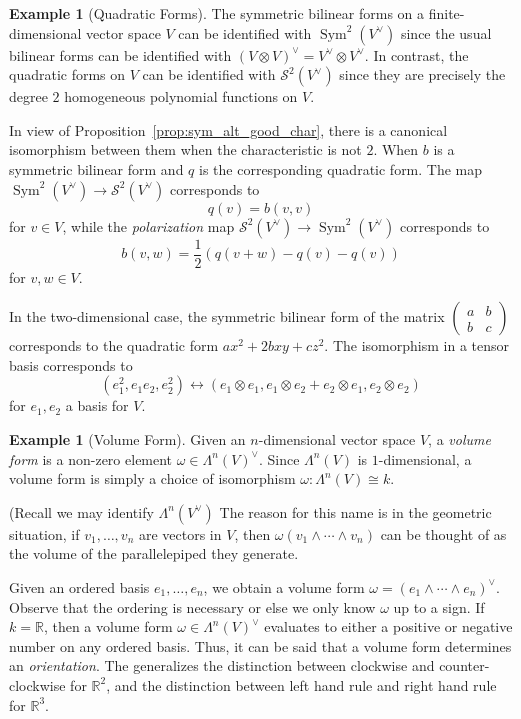 \documentclass[12pt]{article}
\theoremstyle{plain}
\theoremstyle{definition}
\newtheorem{example}[theorem]{Example}
\theoremstyle{remark}
\numberwithin{equation}{section}
\begin{document}
\begin{example}[Quadratic Forms]
The symmetric bilinear forms on a finite-dimensional vector space $V$
can be identified with $\operatorname{Sym}^2(V^\vee)$ since the usual
bilinear forms can be identified with
$(V \otimes V)^\vee=V^\vee \otimes V^\vee$.
In contrast, the quadratic forms on $V$ can be identified with
$\mathcal{S}^2(V^\vee)$ since they are precisely the degree $2$
homogeneous polynomial functions on $V$.

In view of Proposition~\ref{prop:sym_alt_good_char},
there is a canonical isomorphism between them when the characteristic is
not $2$.  When $b$ is a
symmetric bilinear form and $q$ is the corresponding quadratic form.
The map $\operatorname{Sym}^2(V^\vee) \to \mathcal{S}^2(V^\vee)$
corresponds to
\[
q(v) = b(v,v)
\]
for $v\in V$, while the \emph{polarization} map
$\mathcal{S}^2(V^\vee) \to \operatorname{Sym}^2(V^\vee)$
corresponds to
\[
b(v,w) = \frac{1}{2}\left( q(v+w)-q(v)-q(v)\right)
\]
for $v,w \in V$.

In the two-dimensional case,
the symmetric bilinear form of the matrix
$\begin{pmatrix} a & b\\ b&c \end{pmatrix}$ corresponds to the quadratic
form $ax^2+2bxy+cz^2$.  The isomorphism in a tensor basis corresponds to
\[
(e_1^2, e_1e_2, e_2^2) \leftrightarrow
(e_1 \otimes e_1, e_1 \otimes e_2 + e_2 \otimes e_1, e_2 \otimes e_2)
\]
for $e_1, e_2$ a basis for $V$.
\end{example}

\begin{example}[Volume Form]
Given an $n$-dimensional vector space $V$,
a \emph{volume form} is a non-zero element $\omega \in \Lambda^n(V)^\vee$.
Since $\Lambda^n(V)$ is $1$-dimensional, a volume form is simply a
choice of isomorphism $\omega : \Lambda^n(V) \cong k$.

(Recall we may identify $\Lambda^n(V^\vee)$
The reason for this name is in the geometric situation, if
$v_1,\ldots,v_n$ are vectors in $V$, then
$\omega(v_1\wedge \cdots \wedge v_n)$ can be thought of as the volume of
the parallelepiped they generate. 

Given an ordered basis $e_1,\ldots, e_n$, we obtain a volume form
$\omega = (e_1 \wedge \cdots \wedge e_n)^\vee$.
Observe that the ordering is necessary or else we only know $\omega$
up to a sign.
If $k=\mathbb{R}$, then a volume form $\omega \in \Lambda^n(V)^\vee$
evaluates to either a positive or negative number on any ordered basis.
Thus, it can be said that a volume form determines an
\emph{orientation}.
The generalizes the distinction between clockwise and counter-clockwise
for $\mathbb{R}^2$, and the distinction between left hand rule and right
hand rule for $\mathbb{R}^3$.
\end{example}
\end{document}
